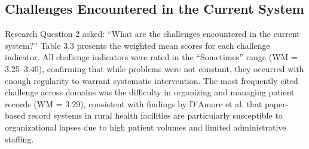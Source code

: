 \documentclass{research}
\begin{document}
\subsection{Challenges Encountered in the Current System}

\indent Research Question 2 asked: ``What are the challenges encountered in the current system?'' Table 3.3 presents the weighted mean scores for each challenge indicator. All challenge indicators were rated in the ``Sometimes'' range (WM = 3.25--3.40), confirming that while problems were not constant, they occurred with enough regularity to warrant systematic intervention. The most frequently cited challenge across domains was the difficulty in organizing and managing patient records (WM = 3.29), consistent with findings by D'Amore et al. \cite{ref12} that paper-based record systems in rural health facilities are particularly susceptible to organizational lapses due to high patient volumes and limited administrative staffing.
\end{document}
